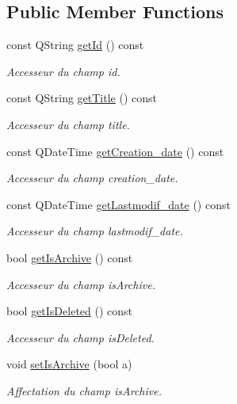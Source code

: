 \subsection*{Public Member Functions}
\begin{DoxyCompactItemize}
\item 
const Q\+String \hyperlink{class_note_afafbebe4aa35b8d29d903bc53fa31929}{get\+Id} () const
\begin{DoxyCompactList}\small\item\em Accesseur du champ id. \end{DoxyCompactList}\item 
const Q\+String \hyperlink{class_note_afd40e5372b7fd231bbd31038bf0bb4d9}{get\+Title} () const
\begin{DoxyCompactList}\small\item\em Accesseur du champ title. \end{DoxyCompactList}\item 
const Q\+Date\+Time \hyperlink{class_note_a89b9be4eae802c78a0959aa9bd408e41}{get\+Creation\+\_\+date} () const
\begin{DoxyCompactList}\small\item\em Accesseur du champ creation\+\_\+date. \end{DoxyCompactList}\item 
const Q\+Date\+Time \hyperlink{class_note_ab1811bb7017d2e1487c90f39b946d572}{get\+Lastmodif\+\_\+date} () const
\begin{DoxyCompactList}\small\item\em Accesseur du champ lastmodif\+\_\+date. \end{DoxyCompactList}\item 
bool \hyperlink{class_note_a3ff22c94b72b8c5cb93638bd16262d0d}{get\+Is\+Archive} () const
\begin{DoxyCompactList}\small\item\em Accesseur du champ is\+Archive. \end{DoxyCompactList}\item 
bool \hyperlink{class_note_af56c546c7e0e471b2dd5b201d4835e37}{get\+Is\+Deleted} () const
\begin{DoxyCompactList}\small\item\em Accesseur du champ is\+Deleted. \end{DoxyCompactList}\item 
void \hyperlink{class_note_acef3631134d65fba4ac015463884164c}{set\+Is\+Archive} (bool a)
\begin{DoxyCompactList}\small\item\em Affectation du champ is\+Archive. \end{DoxyCompactList}\item 

\end{DoxyCompactItemize}
